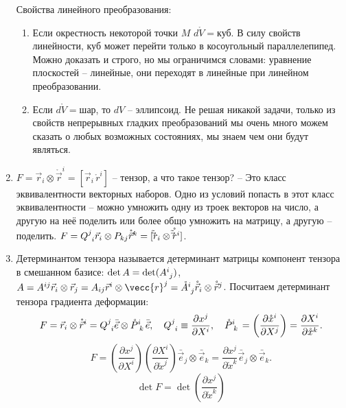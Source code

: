 \begin{enumerate}
    Свойства линейного преобразования:
    \begin{enumerate}
      \item Если окрестность некоторой точки $M$ $d\mathring{V} = \text{куб}$. В силу свойств
        линейности, куб может перейти только в косоугольный параллелепипед. Можно доказать и
        строго, но мы ограничимся словами: уравнение плоскостей -- линейные, они переходят в
        линейные при линейном преобразовании.

      \item Если $d\mathring{V} = \text{шар}$, то $dV$ -- эллипсоид. Не решая никакой задачи, только
        из свойств непрерывных гладких преобразований мы очень много можем сказать о любых возможных
        состояниях, мы знаем чем они будут являться.
    \end{enumerate}

  \item $F = \vec{r}_i \otimes \mathring{\vec{r}}^i = [\vec{r}_i \, \mathring{r}^i]$ -- тензор, а
    что такое тензор? -- Это класс эквивалентности векторных наборов. Одно из условий попасть в этот
    класс эквивалентности -- можно умножить одну из троек векторов на число, а другую на неё поделить
    или более общо умножить на матрицу, а другую -- поделить.
    $F = \tensor{Q}{^j_i} \vec{r}_i \otimes P_{kj} \mathring{\vec{r}}^k = [\tilde \vec{r}_i \otimes
    \mathring{\tilde \vec{r}}^i]$.

  \item Детерминантом тензора называется детерминант матрицы компонент тензора в смешанном базисе:
    $\operatorname{det} A = \operatorname{det} (\tensor{A}{^i_j})$, $A = A^{ij} \vec{r}_i \otimes \vec{r}_j = A_{ij} \vec{r}^i \otimes \vecc{r}^j = \tensor{\mathring{A}}{^i_j} \mathring{\vec{r}}_i \otimes \mathring{\vec{r}}^j$.
    Посчитаем детерминант тензора градиента деформации:
    \[
      F
      = \vec{r}_i \otimes \mathring{\vec{r}}^i
      = \tensor{Q}{^j_i} \bar{\vec{e}} \otimes \tensor{\mathring{P}}{^i_k} \bar{\vec{e}},
      \quad \tensor{Q}{^j_i} \equiv \dfrac{\partial x^j}{\partial X^i},
      \quad \tensor{\mathring{P}}{^i_k} = \left( \dfrac{\partial \mathring{x}^i}{\partial X^j}  \right) = \dfrac{\partial X^i}{\partial \mathring{x}^k}.
    \]
    \[
      F = \left( \dfrac{\partial x^j}{\partial X^i}  \right) \left( \dfrac{\partial X^i}{\partial \mathring{x}^j}  \right) \bar{\vec{e}}_j \otimes \bar{\vec{e}}_k
      = \dfrac{\partial x^j}{\partial \mathring{x}^k} \bar{\vec{e}}_j \otimes \bar{\vec{e}}_k.
    \]
    \[
      \det F = \det \left( \dfrac{\partial x^j}{\partial \mathring{x}^k}  \right) 
    \]
  

\end{enumerate}

